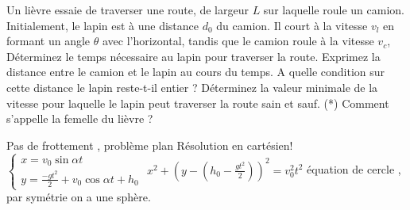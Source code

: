 \begin{Exercise}[title=Le lièvre et le camion]
	Un lièvre essaie de traverser une route, de largeur $L$ sur laquelle roule un camion. Initialement, le lapin est à une distance $d_0$
	du camion. Il court à la vitesse $v_l$ 	en formant un angle $\theta$ avec l'horizontal, tandis que le camion roule à la vitesse $v_c$,
	\Question Déterminez le temps nécessaire au lapin pour traverser la route.
	\Question Exprimez la distance entre le camion et le lapin au cours du temps. A quelle condition sur cette distance le
	lapin reste-t-il entier ?
	\Question Déterminez la valeur minimale de la vitesse	pour laquelle le lapin peut traverser la route sain et sauf.
	\Question (*) Comment s'appelle la femelle du lièvre ?
\end{Exercise}
\begin{Answer}
	\Question Pas de frottement , problème plan
	\Question Résolution en cartésien! $\begin{cases}
	x= v_0 \sin \alpha t \\
	y= \frac{-gt^2}{2} +v_0 \cos \alpha t + h_0
	\end{cases}$
	\Question $x^2 + \left(y-\left(h_0-\frac{gt^2}{2}\right)\right)^2 = v_0^2 t^2$ équation de cercle , par symétrie on a une sphère.
\end{Answer}
